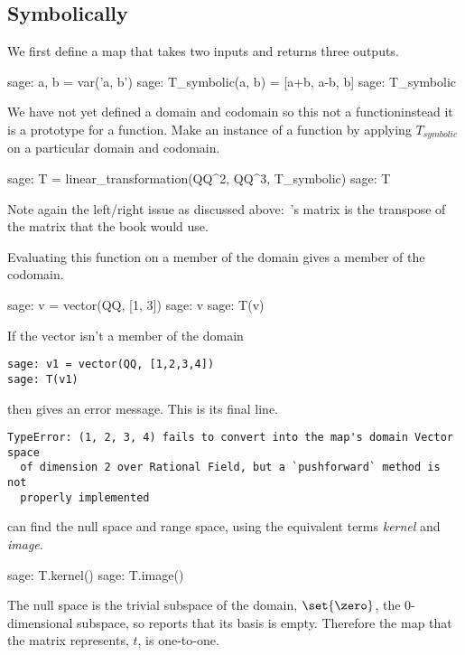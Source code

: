 \subsection{Symbolically}
We first define a map that takes two inputs and returns three outputs.
\begin{sagecommandline}
sage: a, b = var('a, b')   
sage: T_symbolic(a, b) = [a+b, a-b, b]         
sage: T_symbolic       
\end{sagecommandline}
We have not yet defined a domain and codomain 
so this not a function\Dash instead it is a prototype for a function.
Make an instance of a function by applying $T_{\textit{symbolic}}$ on a 
particular domain and codomain.  %
\begin{sagecommandline} 
sage: T = linear_transformation(QQ^2, QQ^3, T_symbolic)
sage: T                                              
\end{sagecommandline}
\noindent Note again the left/right issue as discussed above:~\Sage's matrix is 
the transpose of the matrix that the book would use.

Evaluating this function on a member of the domain gives a member
of the codomain. 
\begin{sagecommandline}
sage: v = vector(QQ, [1, 3])  
sage: v
sage: T(v)
\end{sagecommandline}

If the vector isn't a member of the domain
\begin{lstlisting}
sage: v1 = vector(QQ, [1,2,3,4])
sage: T(v1)
\end{lstlisting}
then \Sage{} gives an error message.
This is its final line.
\begin{lstlisting}
TypeError: (1, 2, 3, 4) fails to convert into the map's domain Vector space 
  of dimension 2 over Rational Field, but a `pushforward` method is not 
  properly implemented
\end{lstlisting}

\Sage{} can find the null space 
and range space, using the equivalent 
terms \textit{kernel} and \textit{image}.
\begin{sagecommandline}
sage: T.kernel()                                       
sage: T.image()                                        
\end{sagecommandline}
The null space is the trivial subspace of the domain,
$\set{\zero}$, the $0$-dimensional
subspace, so \Sage{} reports that its basis is empty.
Therefore the map that the matrix represents, $t$, is one-to-one.


